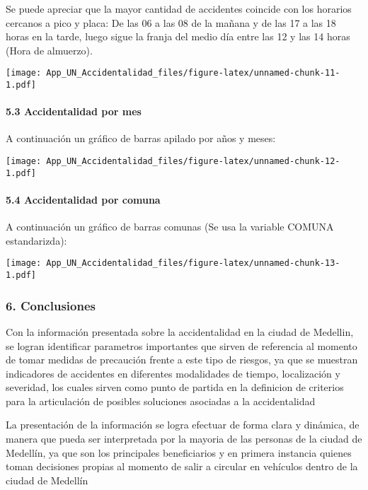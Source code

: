 \documentclass[]{article}
\let\oldparagraph\paragraph
\renewcommand{\paragraph}[1]{\oldparagraph{#1}\mbox{}}
\begin{document}
Se puede apreciar que la mayor cantidad de accidentes coincide con los
horarios cercanos a pico y placa: De las 06 a las 08 de la mañana y de
las 17 a las 18 horas en la tarde, luego sigue la franja del medio día
entre las 12 y las 14 horas (Hora de almuerzo).

\texttt{[image: App\_UN\_Accidentalidad\_files/figure-latex/unnamed-chunk-11-1.pdf]}

\hypertarget{accidentalidad-por-mes}{%
\paragraph{5.3 Accidentalidad por mes}\label{accidentalidad-por-mes}}

A continuación un gráfico de barras apilado por años y meses:

\texttt{[image: App\_UN\_Accidentalidad\_files/figure-latex/unnamed-chunk-12-1.pdf]}

\hypertarget{accidentalidad-por-comuna}{%
\paragraph{5.4 Accidentalidad por
comuna}\label{accidentalidad-por-comuna}}

A continuación un gráfico de barras comunas (Se usa la variable COMUNA
estandarizda):

\texttt{[image: App\_UN\_Accidentalidad\_files/figure-latex/unnamed-chunk-13-1.pdf]}

\hypertarget{conclusiones}{%
\subsubsection{6. Conclusiones}\label{conclusiones}}

Con la información presentada sobre la accidentalidad en la ciudad de
Medellin, se logran identificar parametros importantes que sirven de
referencia al momento de tomar medidas de precaución frente a este tipo
de riesgos, ya que se muestran indicadores de accidentes en diferentes
modalidades de tiempo, localización y severidad, los cuales sirven como
punto de partida en la definicion de criterios para la articulación de
posibles soluciones asociadas a la accidentalidad

La presentación de la información se logra efectuar de forma clara y
dinámica, de manera que pueda ser interpretada por la mayoria de las
personas de la ciudad de Medellín, ya que son los principales
beneficiarios y en primera instancia quienes toman decisiones propias al
momento de salir a circular en vehículos dentro de la ciudad de Medellín
\end{document}
